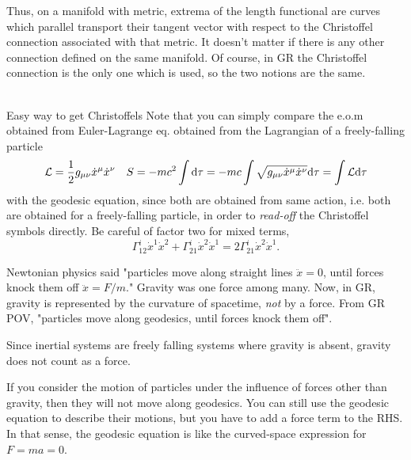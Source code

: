 Thus, on a manifold with metric, extrema of the length functional are curves which parallel transport their tangent vector with respect to the Christoffel
connection associated with that metric. It doesn’t matter if there is any other connection
defined on the same manifold. Of course, in GR the Christoffel connection is the only one
which is used, so the two notions are the same.\\
\\
\begin{mybox}{Easy way to get Christoffels}
	Note that you can simply compare the e.o.m obtained from Euler-Lagrange eq. obtained from the Lagrangian of a freely-falling particle 
	\begin{equation}
		\mathcal{L} = \frac{1}{2} g_{\mu \nu} \dot{x}^\mu \dot{x}^\nu\quad S=- m c^2 \int \mathrm{d} \tau =-mc \int \sqrt{g_{\mu \nu} \dot{x}^\mu \dot{x}^\nu} \mathrm{d} \tau=\int \mathcal{L} \mathrm{d} \tau
	\end{equation}
	with the geodesic equation, since both are obtained from same action, i.e. both are obtained for a freely-falling particle, in order to \emph{read-off} the Christoffel symbols directly. Be careful of factor two for mixed terms,
	\begin{equation*}
		\Gamma^i_{12} \dot{x}^1 \dot{x}^2 + \Gamma^i_{21} \dot{x}^2 \dot{x}^1 = 2 \Gamma^i_{21} \dot{x}^2 \dot{x}^1.
	\end{equation*}
\end{mybox}
Newtonian physics said "particles move along straight lines $\ddot{x} =0$, until forces knock them off $\ddot{x} = F/m$." Gravity was one force among many. Now, in GR, gravity is represented by the curvature of spacetime, \emph{not} by a force. From GR POV, "particles move along geodesics, until forces knock them off".
\begin{statements}
	Since inertial systems are freely falling systems where gravity is absent, gravity does not count as a force.
\end{statements}
If you consider the motion of particles under the influence of forces other than gravity, then they will not move along geodesics. You can still use the geodesic equation to describe their motions, but you have to add a force term to the RHS. In that sense, the geodesic equation is like the curved-space expression for $F =ma=0$.



